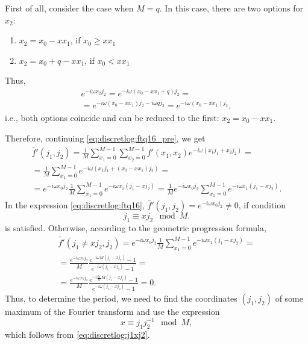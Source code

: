 First of all, consider the case when $M = q$. In this case, there are two options for $x_2$:  
\begin{enumerate}
\item $x_2 = x_0 - x x_1$, if $x_0 \ge x x_1$
\item $x_2 = x_0 + q - x x_1$, if $x_0 < x x_1$
\end{enumerate}
Thus,
\begin{eqnarray}
e^{-i \omega x_2j_2} = e^{-i \omega\left(x_0 - x x_1 + q\right) j_2} = 
\nonumber \\
= e^{-i \omega\left(x_0 - x x_1\right) j_2 - i \omega q j_2} = 
e^{-i \omega\left(x_0 - x x_1\right) j_2},
\nonumber
\end{eqnarray}
i.e., both options coincide and can be reduced to the first: $x_2 = x_0 - x x_1$.

Therefore, continuing \eqref{eq:discretlog:ftq16_pre}, we get
\begin{eqnarray}
\tilde{f'}\left(j_1, j_2\right) = 
\frac{1}{M}\sum_{x_1 = 0}^{M-1}\sum_{x_2 = 0}^{M-1} 
f'\left(x_1, x_2\right)e^{-i \omega\left(x_1 j_1 + x_2j_2\right)} =
\nonumber \\
=
 \frac{1}{M}\sum_{x_1 = 0}^{M-1}
e^{-i \omega\left(x_1 j_1 + (x_0 - x
   x_1) j_2\right)} = 
\nonumber \\
= e^{-i \omega x_0 j_2}\frac{1}{M}\sum_{x_1 = 0}^{M-1}
e^{-i  \omega x_1 \left(j_1 - x j_2\right)} =
\frac{1}{M} e^{-i \omega x_0 j_2} 
\sum_{x_1 = 0}^{M-1} e^{-i  \omega x_1 \left(j_1 - x j_2\right)}.
\label{eq:discretlog:ftq16}
\end{eqnarray}
In the expression \eqref{eq:discretlog:ftq16}, $\tilde{f'}(j_1, j_2) = e^{-i \omega x_0 j_2} \ne 0$, if condition 
\begin{equation}
j_1 \equiv x j_2 \mod M.
\label{eq:discretlog:j1xj2}
\end{equation} 
is satisfied. Otherwise, according to the geometric progression formula,
\begin{eqnarray}
\tilde{f'}\left(j_1 \ne x j_2, j_2\right) = 
e^{-i \omega x_0 j_2}\frac{1}{M}
\sum_{x_1 = 0}^{M-1}e^{-i
  \omega x_1 \left(j_1 - x j_2\right)} = 
\nonumber \\
=
\frac{e^{-i \omega x_0 j_2}}{M} \frac{e^{-i
  \omega M \left(j_1 - x j_2\right)} - 1}{e^{-i
  \omega \left(j_1 - x j_2\right)} - 1} = 
\nonumber \\
=
 \frac{e^{-i \omega x_0 j_2}}{M} 
\frac{e^{-i \frac{2 \pi}{M} M \left(j_1 - x j_2\right)} - 1}{e^{-i
  \omega \left(j_1 - x j_2\right)} - 1} = 0.
\nonumber
\end{eqnarray} 
Thus, to determine the period, we need to find the coordinates $(j_1, j_2)$ of some maximum of the Fourier transform and use the expression 
\begin{equation}
x \equiv j_1 j_2^{-1} \mod M,
\label{eq:discretlog:periodfourier}
\end{equation}
which follows from \eqref{eq:discretlog:j1xj2}.

